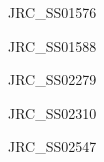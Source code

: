 \documentclass[17pt]{extarticle}
\begin{document}
\newpage\vspace*{-0.15cm}
\begin{large}
JRC\_SS01576 \\[0.5em]
\end{large}

\newpage\vspace*{-0.15cm}
\begin{large}
JRC\_SS01588 \\[0.5em]
\end{large}

\newpage\vspace*{-0.15cm}
\begin{large}
JRC\_SS02279 \\[0.5em]
\end{large}

\newpage\vspace*{-0.15cm}
\begin{large}
JRC\_SS02310 \\[0.5em]
\end{large}

\newpage\vspace*{-0.15cm}
\begin{large}
JRC\_SS02547 \\[0.5em]
\end{large}

\newpage
\end{document}
